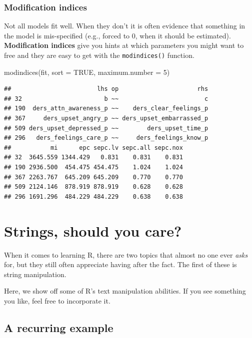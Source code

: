 \documentclass[
]{book}
\newenvironment{Shaded}{\begin{snugshade}}{\end{snugshade}}
\newcommand{\AttributeTok}[1]{\textcolor[rgb]{0.77,0.63,0.00}{#1}}
\newcommand{\ConstantTok}[1]{\textcolor[rgb]{0.00,0.00,0.00}{#1}}
\newcommand{\DecValTok}[1]{\textcolor[rgb]{0.00,0.00,0.81}{#1}}
\newcommand{\FunctionTok}[1]{\textcolor[rgb]{0.00,0.00,0.00}{#1}}
\newcommand{\NormalTok}[1]{#1}
\begin{document}
\hypertarget{modification-indices}{%
\subsection{Modification indices}\label{modification-indices}}

Not all models fit well. When they don't it is often evidence that something in the model is mis-specified (e.g., forced to 0, when it should be estimated). \textbf{Modification indices} give you hints at which parameters you might want to free and they are easy to get with the \texttt{modindices()} function.

\begin{Shaded}
\begin{Highlighting}[]
\FunctionTok{modindices}\NormalTok{(fit, }\AttributeTok{sort =} \ConstantTok{TRUE}\NormalTok{, }\AttributeTok{maximum.number =} \DecValTok{5}\NormalTok{)}
\end{Highlighting}
\end{Shaded}

\begin{verbatim}
##                        lhs op                      rhs
## 32                       b ~~                        c
## 190  ders_attn_awareness_p ~~    ders_clear_feelings_p
## 367     ders_upset_angry_p ~~ ders_upset_embarrassed_p
## 509 ders_upset_depressed_p ~~        ders_upset_time_p
## 296   ders_feelings_care_p ~~     ders_feelings_know_p
##           mi      epc sepc.lv sepc.all sepc.nox
## 32  3645.559 1344.429   0.831    0.831    0.831
## 190 2936.500  454.475 454.475    1.024    1.024
## 367 2263.767  645.209 645.209    0.770    0.770
## 509 2124.146  878.919 878.919    0.628    0.628
## 296 1691.296  484.229 484.229    0.638    0.638
\end{verbatim}

\hypertarget{strings-should-you-care}{%
\chapter{Strings, should you care?}\label{strings-should-you-care}}

When it comes to learning R, there are two topics that almost no one ever \emph{asks} for, but they still often appreciate having after the fact. The first of these is string manipulation.

Here, we show off some of R's text manipulation abilities. If you see something you like, feel free to incorporate it.

\hypertarget{a-recurring-example}{%
\section{A recurring example}\label{a-recurring-example}}
\end{document}
